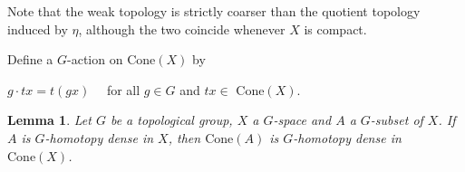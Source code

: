 \documentclass[12pt]{amsart}
\newtheorem{lemma}[theorem]{Lemma}
\theoremstyle{definition}
\begin{document}
	Note that the weak topology is strictly coarser than the quotient topology induced by $\eta$, although the two coincide whenever $X$ is compact.
	
	Define a $G$-action on $\mathrm{Cone}(X)$ by
	
	\begin{center}
		$g\cdot tx=t(gx)\quad$ for all $g\in G$ and $tx\in$ $\mathrm{Cone}(X)$.
	\end{center}
	
	\begin{lemma}\label{lemmacone(A)GHDcone(X)}
		\rm{Let $G$ be a topological group, $X$ a $G$-space and $A$ a $G$-subset of $X$. If $A$ is $G$-homotopy dense in $X$, then $\mathrm{Cone}(A)$ is $G$-homotopy dense in $\mathrm{Cone}(X)$.}
	\end{lemma}
	
\end{document}

